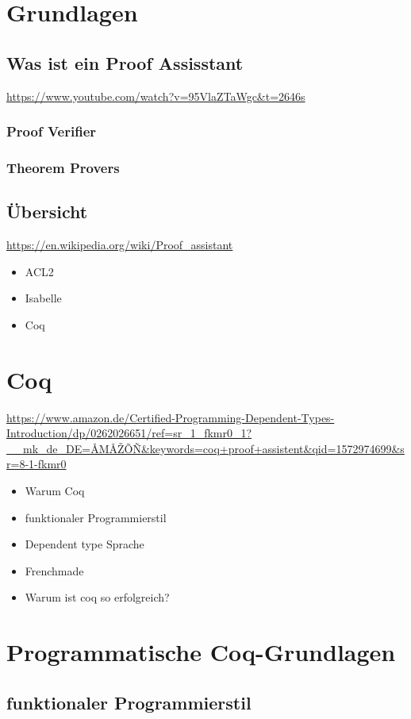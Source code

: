 \section{Grundlagen}
\subsection{Was ist ein Proof Assisstant}
\url{https://www.youtube.com/watch?v=95VlaZTaWgc&t=2646s}
\subsubsection{Proof Verifier}
\subsubsection{Theorem Provers}

\subsection{Übersicht}
\url{https://en.wikipedia.org/wiki/Proof_assistant}
\begin{itemize}
	\item ACL2
	\item Isabelle
	\item Coq
\end{itemize}

\section{Coq}
\url{https://www.amazon.de/Certified-Programming-Dependent-Types-Introduction/dp/0262026651/ref=sr_1_fkmr0_1?__mk_de_DE=ÅMÅŽÕÑ&keywords=coq+proof+assistent&qid=1572974699&sr=8-1-fkmr0}
\begin{itemize}
	\item Warum Coq
	\item funktionaler Programmierstil
	\item Dependent type Sprache
	\item Frenchmade
	\item Warum ist coq so erfolgreich?
\end{itemize}

\section{Programmatische Coq-Grundlagen}
\subsection{funktionaler Programmierstil}
